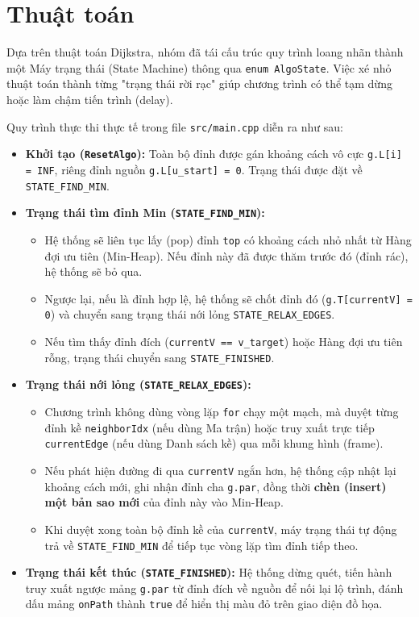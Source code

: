 \documentclass[12pt,a4paper,oneside]{report}
\begin{document}
\section{Thuật toán}
Dựa trên thuật toán Dijkstra, nhóm đã tái cấu trúc quy trình loang nhãn thành một Máy trạng thái (State Machine) thông qua \texttt{enum AlgoState}. Việc xé nhỏ thuật toán thành từng "trạng thái rời rạc" giúp chương trình có thể tạm dừng hoặc làm chậm tiến trình (delay).

Quy trình thực thi thực tế trong file \texttt{src/main.cpp} diễn ra như sau:
\begin{itemize}
    \item \textbf{Khởi tạo (\texttt{ResetAlgo}):} 
    Toàn bộ đỉnh được gán khoảng cách vô cực \texttt{g.L[i] = INF}, riêng đỉnh nguồn \texttt{g.L[u\_start] = 0}. Trạng thái được đặt về \texttt{STATE\_FIND\_MIN}.
    
    \item \textbf{Trạng thái tìm đỉnh Min (\texttt{STATE\_FIND\_MIN}):}
    \begin{itemize}
        \item Hệ thống sẽ liên tục lấy (pop) đỉnh \texttt{top} có khoảng cách nhỏ nhất từ Hàng đợi ưu tiên (Min-Heap). Nếu đỉnh này đã được thăm trước đó (đỉnh rác), hệ thống sẽ bỏ qua.
        \item Ngược lại, nếu là đỉnh hợp lệ, hệ thống sẽ chốt đỉnh đó (\texttt{g.T[currentV] = 0}) và chuyển sang trạng thái nới lỏng \texttt{STATE\_RELAX\_EDGES}.
        \item Nếu tìm thấy đỉnh đích (\texttt{currentV == v\_target}) hoặc Hàng đợi ưu tiên rỗng, trạng thái chuyển sang \texttt{STATE\_FINISHED}.
    \end{itemize}
    
    \item \textbf{Trạng thái nới lỏng (\texttt{STATE\_RELAX\_EDGES}):}
    \begin{itemize}
        \item Chương trình không dùng vòng lặp \texttt{for} chạy một mạch, mà duyệt từng đỉnh kề \texttt{neighborIdx} (nếu dùng Ma trận) hoặc truy xuất trực tiếp \texttt{currentEdge} (nếu dùng Danh sách kề) qua mỗi khung hình (frame). 
        \item Nếu phát hiện đường đi qua \texttt{currentV} ngắn hơn, hệ thống cập nhật lại khoảng cách mới, ghi nhận đỉnh cha \texttt{g.par}, đồng thời \textbf{chèn (insert) một bản sao mới} của đỉnh này vào Min-Heap.
        \item Khi duyệt xong toàn bộ đỉnh kề của \texttt{currentV}, máy trạng thái tự động trả về \texttt{STATE\_FIND\_MIN} để tiếp tục vòng lặp tìm đỉnh tiếp theo.
    \end{itemize}

    \item \textbf{Trạng thái kết thúc (\texttt{STATE\_FINISHED}):}
    Hệ thống dừng quét, tiến hành truy xuất ngược mảng \texttt{g.par} từ đỉnh đích về nguồn để nối lại lộ trình, đánh dấu mảng \texttt{onPath} thành \texttt{true} để hiển thị màu đỏ trên giao diện đồ họa.
\end{itemize}
\end{document}
